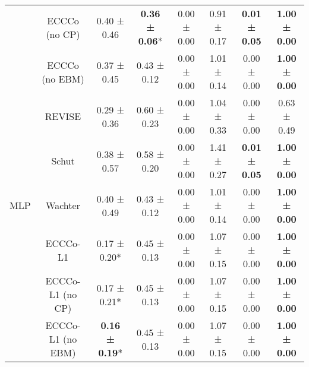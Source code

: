 \begin{table}
{\begin{tabular}[t]{cccccccc}
 & ECCCo (no CP) & 0.40 ± 0.46\hphantom{*}\hphantom{*} & \textbf{0.36 ± 0.06}*\hphantom{*} & 0.00 ± 0.00\hphantom{*}\hphantom{*} & 0.91 ± 0.17\hphantom{*}\hphantom{*} & \textbf{0.01 ± 0.05}\hphantom{*}\hphantom{*} & \textbf{1.00 ± 0.00}\hphantom{*}\hphantom{*}\\

 & ECCCo (no EBM) & 0.37 ± 0.45\hphantom{*}\hphantom{*} & 0.43 ± 0.12\hphantom{*}\hphantom{*} & 0.00 ± 0.00\hphantom{*}\hphantom{*} & 1.01 ± 0.14\hphantom{*}\hphantom{*} & 0.00 ± 0.00\hphantom{*}\hphantom{*} & \textbf{1.00 ± 0.00}\hphantom{*}\hphantom{*}\\

 & REVISE & 0.29 ± 0.36\hphantom{*}\hphantom{*} & 0.60 ± 0.23\hphantom{*}\hphantom{*} & 0.00 ± 0.00\hphantom{*}\hphantom{*} & 1.04 ± 0.33\hphantom{*}\hphantom{*} & 0.00 ± 0.00\hphantom{*}\hphantom{*} & 0.63 ± 0.49\hphantom{*}\hphantom{*}\\

 & Schut & 0.38 ± 0.57\hphantom{*}\hphantom{*} & 0.58 ± 0.20\hphantom{*}\hphantom{*} & 0.00 ± 0.00\hphantom{*}\hphantom{*} & 1.41 ± 0.27\hphantom{*}\hphantom{*} & \textbf{0.01 ± 0.05}\hphantom{*}\hphantom{*} & \textbf{1.00 ± 0.00}\hphantom{*}\hphantom{*}\\

\multirow[t]{-9}{*}{\centering\arraybackslash MLP} & Wachter & 0.40 ± 0.49\hphantom{*}\hphantom{*} & 0.43 ± 0.12\hphantom{*}\hphantom{*} & 0.00 ± 0.00\hphantom{*}\hphantom{*} & 1.01 ± 0.14\hphantom{*}\hphantom{*} & 0.00 ± 0.00\hphantom{*}\hphantom{*} & \textbf{1.00 ± 0.00}\hphantom{*}\hphantom{*}\\
\cmidrule{1-8}
 & ECCCo-L1 & 0.17 ± 0.20*\hphantom{*} & 0.45 ± 0.13\hphantom{*}\hphantom{*} & 0.00 ± 0.00\hphantom{*}\hphantom{*} & 1.07 ± 0.15\hphantom{*}\hphantom{*} & 0.00 ± 0.00\hphantom{*}\hphantom{*} & \textbf{1.00 ± 0.00}\hphantom{*}\hphantom{*}\\

 & ECCCo-L1 (no CP) & 0.17 ± 0.21*\hphantom{*} & 0.45 ± 0.13\hphantom{*}\hphantom{*} & 0.00 ± 0.00\hphantom{*}\hphantom{*} & 1.07 ± 0.15\hphantom{*}\hphantom{*} & 0.00 ± 0.00\hphantom{*}\hphantom{*} & \textbf{1.00 ± 0.00}\hphantom{*}\hphantom{*}\\

 & ECCCo-L1 (no EBM) & \textbf{0.16 ± 0.19}*\hphantom{*} & 0.45 ± 0.13\hphantom{*}\hphantom{*} & 0.00 ± 0.00\hphantom{*}\hphantom{*} & 1.07 ± 0.15\hphantom{*}\hphantom{*} & 0.00 ± 0.00\hphantom{*}\hphantom{*} & \textbf{1.00 ± 0.00}\hphantom{*}\hphantom{*}\\


\end{tabular}}
\end{table}
